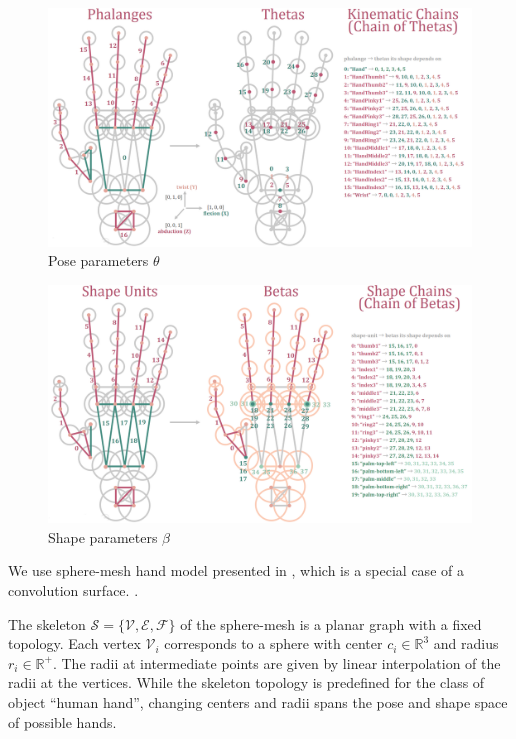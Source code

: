 \begin{figure}[h!]
\centering
\includegraphics[width=1\linewidth]{figures/thetas}
\caption{Pose parameters $\theta$}
\label{fig:thetas}
\end{figure}

\begin{figure}[h!]
\centering
\includegraphics[width=1\linewidth]{figures/betas}
\caption{Shape parameters $\beta$}
\label{fig:betas}
\end{figure}

We use sphere-mesh hand model presented in \cite{tkach2016sphere}, which is a special case of a convolution surface. \textbf{\color{accent}{Maybe briefly recap advantages of sphere-meshes hand model representation}}. 

The skeleton $\mathcal{S} = \{\mathcal{V}, \mathcal{E}, \mathcal{F}\}$ of the sphere-mesh is a planar graph with a fixed topology. Each vertex $\mathcal{V}_i$ corresponds to a sphere with center $c_i \in \mathbb{R}^3$ and radius $r_i \in \mathbb{R}^+$. The radii at intermediate points are given by linear interpolation of the radii at the vertices.
While the skeleton topology is predefined for the class of object ``human hand'', changing centers and radii spans the pose and shape space of possible hands.


